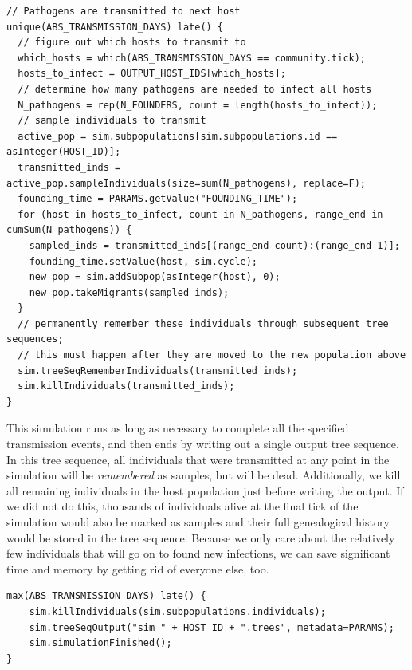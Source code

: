 \documentclass[12pt]{article}
\begin{document}
\begin{lstlisting}[language=slim, style=slimstyle, breaklines=true]
// Pathogens are transmitted to next host
unique(ABS_TRANSMISSION_DAYS) late() {
  // figure out which hosts to transmit to
  which_hosts = which(ABS_TRANSMISSION_DAYS == community.tick);
  hosts_to_infect = OUTPUT_HOST_IDS[which_hosts];
  // determine how many pathogens are needed to infect all hosts
  N_pathogens = rep(N_FOUNDERS, count = length(hosts_to_infect));
  // sample individuals to transmit
  active_pop = sim.subpopulations[sim.subpopulations.id == asInteger(HOST_ID)];
  transmitted_inds = active_pop.sampleIndividuals(size=sum(N_pathogens), replace=F);
  founding_time = PARAMS.getValue("FOUNDING_TIME");
  for (host in hosts_to_infect, count in N_pathogens, range_end in cumSum(N_pathogens)) {
    sampled_inds = transmitted_inds[(range_end-count):(range_end-1)];
    founding_time.setValue(host, sim.cycle);
    new_pop = sim.addSubpop(asInteger(host), 0);
    new_pop.takeMigrants(sampled_inds);
  }
  // permanently remember these individuals through subsequent tree sequences;
  // this must happen after they are moved to the new population above
  sim.treeSeqRememberIndividuals(transmitted_inds);
  sim.killIndividuals(transmitted_inds);
}
\end{lstlisting}

This simulation runs as long as necessary to complete all the specified transmission events,
and then ends by writing out a single output tree sequence.
In this tree sequence, all
individuals that were transmitted at any point in the simulation will be \textit{remembered} as samples, but will be dead. Additionally, we kill all remaining individuals in the host population
just before writing the output. If we did not do this, thousands of individuals alive at the final tick of the simulation would also be marked as samples and their full genealogical history
would be stored in the tree sequence. Because we only care about the relatively few individuals that will go on to found new infections, we can save significant time and memory
by getting rid of everyone else, too.
\begin{lstlisting}[language=slim, style=slimstyle, breaklines=true]
max(ABS_TRANSMISSION_DAYS) late() {
	sim.killIndividuals(sim.subpopulations.individuals);
	sim.treeSeqOutput("sim_" + HOST_ID + ".trees", metadata=PARAMS);
	sim.simulationFinished();
}
\end{lstlisting}
\end{document}
